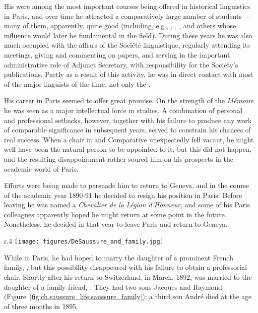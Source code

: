 His were among the most important courses being offered in historical
linguistics in Paris, and over time he attracted a comparatively large
number of students --- many of them, apparently, quite good
(including, e.g., , , , and
others whose influence would later be fundamental in the field).
During these years he was also much occupied with the affiars of the
Société linguistique, regularly attending its meetings, giving and
commenting on papers, and serving in the important administrative role
of Adjunct Secretary, with responsibility for the Society's
publications. Partly as a result of this activity, he was in direct
contact with most of the major linguists of the time, not only the
.

His career in Paris seemed to offer great promise. On the strength of
the \textsl{Mémoire} he was seen as a major intellectual force in
 studies. A combination of personal and professional
setbacks, however, together with his failure to produce any work of
comparable significance in subsequent years, served to constrain his
chances of real success.  When a chair in  and Comparative
 unexpectedly fell vacant, he might well have been the
natural person to be appointed to it, but this did not happen, and the
resulting disappointment rather soured him on his prospects in the
academic world of Paris.

Efforts were being made to persuade him to return to Geneva, and in
the course of the academic year 1890-91 he decided to resign his
position in Paris. Before leaving he was named a \emph{Chevalier de la
  Légion d'Honneur}, and some of his Paris colleagues apparently hoped
he might return at some point in the future.  Nonetheless, he decided
in that year to leave Paris and return to Geneva.

\begin{wrapfigure}{r}{.4\textwidth}
  \texttt{[image: figures/DeSaussure\_and\_family.jpg]}
  \caption{Ferdinand de Saussure with his wife Marie and sons Jacques [l.]
    and Raymond [r.]}
  \label{fig:ch.saussure_life.saussure_family}
\end{wrapfigure}
While in Paris, he had hoped to marry the daughter of a prominent
{French} family, , but this possibility disappeared with his
failure to obtain a professorial chair. Shortly after his return to
Switzerland, in March, 1892, {\Saussure} was married to the daughter of a
family friend, . They had two sons Jacques and
Raymond (Figure~\ref{fig:ch.saussure_life.saussure_family}); a third
son André died at the age of three months in 1895.

